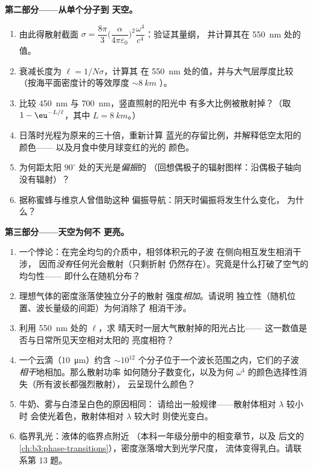 \begin{problem}
\medskip\noindent\textbf{第二部分——从单个分子到
天空。}
\begin{enumerate}[resume]
  \item 由此得散射截面 $\sigma =
        \dfrac{8\pi}{3}\Big(\dfrac{\alpha}{4\pi\varepsilon_0}
        \Big)^2\dfrac{\omega^4}{c^4}$：验证其量纲，
        并计算其在 \qty{550}{nm} 处的值。
  \item 衰减长度为 $\ell = 1/N\sigma$，计算其
        在 \qty{550}{nm} 处的值，并与大气层厚度比较
        （按海平面密度计的等效厚度 $\sim\qty{8}{km}$
        ）。
  \item 比较 \qty{450}{nm} 与 \qty{700}{nm}，竖直照射的阳光中
        有多大比例被散射掉？（取 $1 -
        \eu^{-L/\ell}$，其中 $L = \qty{8}{km}$。）
  \item 日落时光程为原来的三十倍，重新计算
        蓝光的存留比例，并解释低空太阳的颜色——
        以及月食中使月球变红的光的
        颜色。
  \item 为何距太阳 $90^\circ$ 处的天光是\emph{偏振}的
        （回想偶极子的辐射图样：沿偶极子轴向
        没有辐射）？
  \item 据称蜜蜂与维京人曾借助这种
        偏振导航：阴天时偏振将发生什么变化，
        为什么？
\end{enumerate}

\medskip\noindent\textbf{第三部分——天空为何不
更亮。}
\begin{enumerate}[resume]
  \item 一个悖论：在完全均匀的介质中，相邻体积元的子波
        在侧向相互发生相消干涉，
        因而\emph{没有}任何光会散射（只剩折射
        仍然存在）。究竟是什么打破了空气的均匀性——
        即什么在随机分布？
  \item 理想气体的密度涨落使独立分子的散射
        强度\emph{相加}。请说明
        独立性（随机位置、波长量级的间距）为何消除了
        相消干涉。
  \item 利用 \qty{550}{nm} 处的 $\ell$，求
        晴天时一层大气散射掉的阳光占比——
        这一数值是否与日常所见天空相对太阳的
        亮度相符？
  \item 一个云滴（\qty{10}{\micro m}）约含 $\sim10^{12}$
        个分子位于一个波长范围之内，它们的子波
        \emph{相干}地相加。那么散射功率
        如何随分子数变化，以及为何 $\omega^4$
        的颜色选择性消失（所有波长都强烈散射），
        云呈现什么颜色？
  \item 牛奶、雾与白漆呈白色的原因相同：
        请给出一般规律——散射体相对 $\lambda$ 较小时
        会使光着色，散射体相对 $\lambda$ 较大时
        则使光变白。
  \item 临界乳光：液体的临界点附近
        （本科一年级分册中的相变章节，以及
        后文的\cref{ch:b3:phase-transitions}），密度涨落增大到光学尺度，
        流体变得乳白。请联系第 13 题。
\end{enumerate}


\end{problem}
